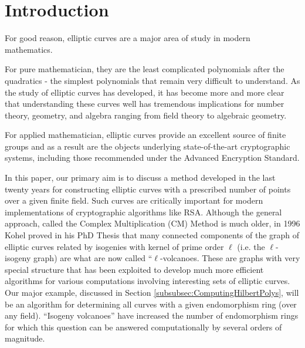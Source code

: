\documentclass{amsart}
\theoremstyle{definition}
\theoremstyle{remark}
\numberwithin{equation}{section}
\begin{document}

 \tableofcontents


\section{Introduction}

 For good reason, elliptic curves are a major area of study in modern mathematics. 
 
 For pure mathematician, they are the least complicated polynomials after the quadratics - the simplest polynomials that remain very difficult to understand. As the study of elliptic curves has developed, it has become more and more clear that understanding these curves well has tremendous implications for number theory, geometry, and algebra ranging from field theory to algebraic geometry. 
 
 For applied mathematician, elliptic curves provide an excellent source of finite groups and as a result are the objects underlying state-of-the-art cryptographic systems, including those recommended under the Advanced Encryption Standard.
 
 In this paper, our primary aim is to discuss a method developed in the last twenty years for constructing elliptic curves with a prescribed number of points over a given finite field. Such curves are critically important for modern implementations of cryptographic algorithms like RSA. Although the general approach, called the Complex Multiplication (CM) Method is much older, in 1996 Kohel proved in his PhD Thesis \cite{KohelThesis} that many connected components of the graph of elliptic curves related by isogenies with kernel of prime order $\ell$ (i.e. the $\ell$-isogeny graph) are what are now called ``$\ell$-volcanoes. These are graphs with very special structure that has been exploited to develop much more efficient algorithms for various computations involving interesting sets of elliptic curves. Our major example, discussed in Section \ref{subsubsec:ComputingHilbertPolys}, will be an algorithm for determining all curves with a given endomorphism ring (over any field). ``Isogeny volcanoes'' have increased the number of endomorphism rings for which this question can be answered computationally by several orders of magnitude.
 
\end{document}
